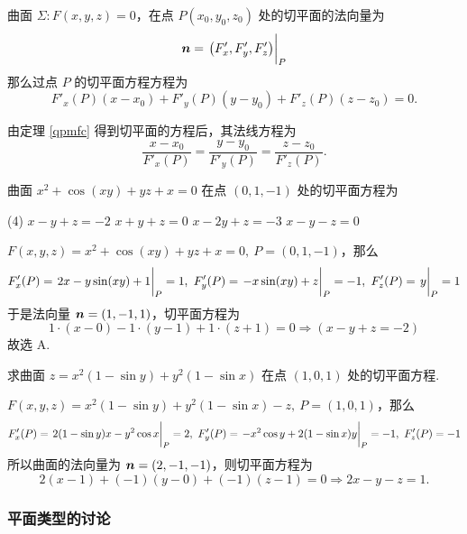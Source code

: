\begin{theorem}[切平面方程]
    曲面 $\varSigma:F(x,y,z)=0$，在点 $P(x_0,y_0,z_0)$ 处的切平面的法向量为
    $$\vb*{n}=\eval{\qty(F'_x,F'_y,F'_z)}_{P}$$
    那么过点 $P$ 的切平面方程方程为 
    $$F'_x(P)(x-x_0)+F'_y(P)(y-y_0)+F'_z(P)(z-z_0)=0.$$
    \label{qpmfc}
\end{theorem}

\begin{theorem}[法线方程]
    由定理 \ref{qpmfc} 得到切平面的方程后，其法线方程为 $$\dfrac{x-x_0}{F'_x(P)}=\dfrac{y-y_0}{F'_y(P)}=\dfrac{z-z_0}{F'_z(P)}.$$
\end{theorem}

\begin{example}[2013 数一]
    曲面 $x^2+\cos(xy)+yz+x=0$ 在点 $(0,1,-1)$ 处的切平面方程为
    \begin{tasks}(4)
        \task $x-y+z=-2$
        \task $x+y+z=0$
        \task $x-2y+z=-3$
        \task $x-y-z=0$
    \end{tasks}
\end{example}
\begin{solution}
    $F(x,y,z)=x^2+\cos(xy)+yz+x=0,~P=(0,1,-1)$，那么 
    $$F'_x(P)=\eval{2x-y\sin(xy)+1}_{P}=1,~F'_y(P)=\eval{-x\sin(xy)+z}_{P}=-1,~F'_z(P)=\eval{y}_{P}=1$$
    于是法向量 $\vb*{n}=(1,-1,1)$，切平面方程为 $$1\cdot(x-0)-1\cdot(y-1)+1\cdot(z+1)=0\Rightarrow(x-y+z=-2)$$
    故选 A.
\end{solution}

\begin{example}[2014 数一]
    求曲面 $z=x^2(1-\sin y)+y^2(1-\sin x)$ 在点 $(1,0,1)$ 处的切平面方程.
\end{example}
\begin{solution}
    $F(x,y,z)=x^2(1-\sin y)+y^2(1-\sin x)-z,~P=(1,0,1)$，那么 
    $$F'_x(P)=\eval{2(1-\sin y)x-y^2\cos x}_{P}=2,~F'_y(P)=\eval{-x^2\cos y+2(1-\sin x)y}_{P}=-1,~F'_z(P)=-1$$
    所以曲面的法向量为 $\vb*{n}=(2,-1,-1)$，则切平面方程为 $$2(x-1)+(-1)(y-0)+(-1)(z-1)=0\Rightarrow 2x-y-z=1.$$
\end{solution}

\subsubsection{平面类型的讨论}

